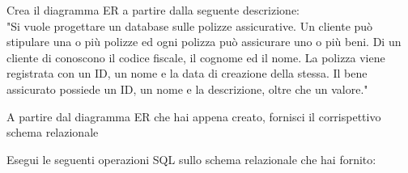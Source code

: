\documentclass[addpoints]{exam}
\begin{document}
 
 
\vspace{5mm}
 
 
\vspace{5mm}
 
 
\begin{questions}
\question[3] Crea il diagramma ER a partire dalla seguente descrizione:\\ "Si vuole progettare un database sulle polizze assicurative. Un cliente può stipulare una o più polizze ed ogni polizza può assicurare uno o più beni. Di un cliente di conoscono il codice fiscale, il cognome ed il nome. La polizza viene registrata con un ID, un nome e la data di creazione della stessa. Il bene assicurato possiede un ID, un nome e la descrizione, oltre che un valore."

\question[2] A partire dal diagramma ER che hai appena creato, fornisci il corrispettivo schema relazionale

\question Esegui le seguenti operazioni SQL sullo schema relazionale che hai fornito:



 
\end{questions}

\begin{center}
	\gradetable[h][questions]
\end{center}
\end{document}

